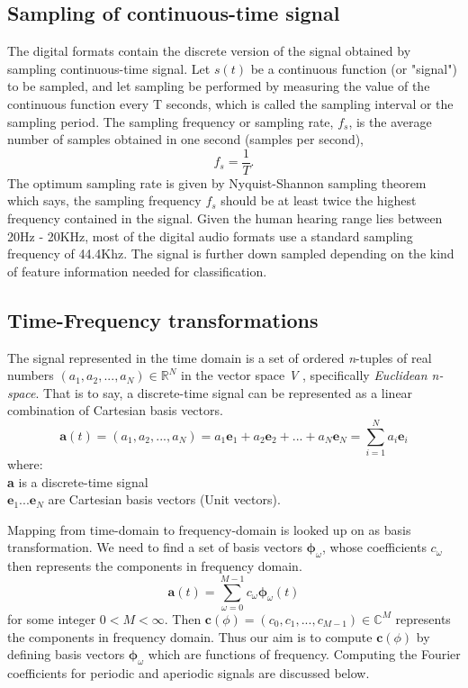 \subsection{Sampling of continuous-time signal}
\label{sampling}
The digital formats contain the discrete version of the signal obtained by sampling continuous-time signal. Let $s(t)$ be a continuous function (or "signal") to be sampled, and let sampling be performed by measuring the value of the continuous function every T seconds, which is called the sampling interval or the sampling period. The sampling frequency or sampling rate, $f_{s}$, is the average number of samples obtained in one second (samples per second),  
\[
 f_{s} = \frac{1}{T}.
\]
The optimum sampling rate is given by Nyquist-Shannon sampling theorem which says, the sampling frequency $f_{s}$ should be at least twice the highest frequency contained in the signal. Given the human hearing range lies between 20Hz - 20KHz, most of the digital audio formats use a standard sampling frequency of 44.4Khz. The signal is further down sampled depending on the kind of feature information needed for classification. 


\subsection{Time-Frequency transformations}
\label{time}
The signal represented in the time domain is a set of ordered \textit{n}-tuples of real numbers \( (a_{1},a_{2}, ...,a_{N}) \in \mathbb{R}^N \) in the vector space \textit{V} , specifically \textit{Euclidean n-space}. That is to say, a discrete-time signal can be represented as a linear combination of Cartesian basis vectors. 
\begin{equation}
\textbf{a}(t) = (a_{1},a_{2}, ...,a_{N}) = a_{1}\textbf{e}_{1} + a_{2}\textbf{e}_{2} + ... + a_{N}\textbf{e}_{N} = \displaystyle\sum_{i=1}^{N}a_{i}\textbf{e}_{i}
\end{equation} 
where:\\
\indent \textbf{a} is a discrete-time signal\\
\indent $\textbf{e}_{1} ... \textbf{e}_{N}$ are Cartesian basis vectors (Unit vectors).
\bigskip

\noindent Mapping from time-domain to frequency-domain is looked up on as basis transformation. We need to find a set of basis vectors $\bm{\phi}_{ \omega }$, whose coefficients $c_{ \omega }$ then represents the components in frequency domain. 
\begin{equation}
\label{exp_fourier}
\textbf{a}(t) = \displaystyle\sum_{ \omega =0}^{M-1}c_{ \omega }\bm{\phi}_{ \omega }(t) 
\end{equation}
for some integer $0 < M < \infty$. Then $\textbf{c}(\phi) = (c_{0},c_{1}, ...,c_{M-1}) \in \mathbb{C}^M $ represents the components in frequency domain. Thus our aim is to compute $\textbf{c}(\phi)$ by defining basis vectors $\bm{\phi}_{\omega}$ which are functions of frequency. Computing the Fourier coefficients for periodic and aperiodic signals are discussed below.

